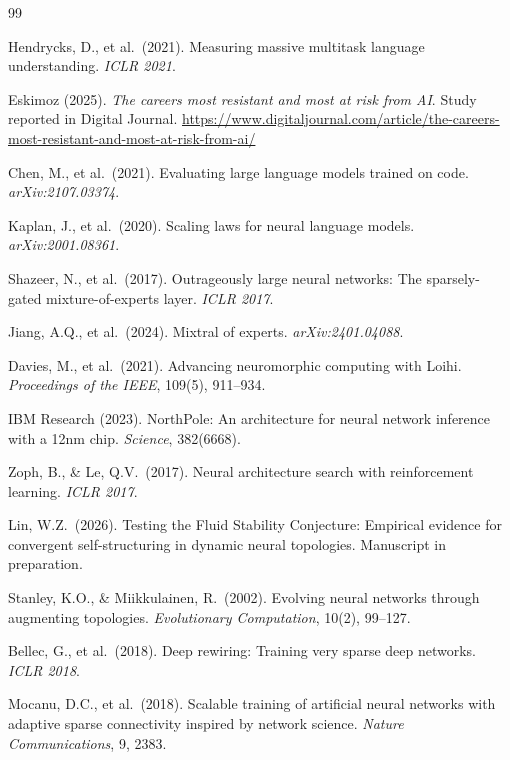 \documentclass[12pt]{article}
\begin{document}
\begin{thebibliography}{99}

 Hendrycks, D., et al.\ (2021). Measuring massive multitask language understanding. \textit{ICLR 2021}.

 Eskimoz (2025). \textit{The careers most resistant and most at risk from AI}. Study reported in Digital Journal. \url{https://www.digitaljournal.com/article/the-careers-most-resistant-and-most-at-risk-from-ai/}

 Chen, M., et al.\ (2021). Evaluating large language models trained on code. \textit{arXiv:2107.03374}.

 Kaplan, J., et al.\ (2020). Scaling laws for neural language models. \textit{arXiv:2001.08361}.

 Shazeer, N., et al.\ (2017). Outrageously large neural networks: The sparsely-gated mixture-of-experts layer. \textit{ICLR 2017}.

 Jiang, A.Q., et al.\ (2024). Mixtral of experts. \textit{arXiv:2401.04088}.

 Davies, M., et al.\ (2021). Advancing neuromorphic computing with Loihi. \textit{Proceedings of the IEEE}, 109(5), 911--934.

 IBM Research (2023). NorthPole: An architecture for neural network inference with a 12nm chip. \textit{Science}, 382(6668).

 Zoph, B., \& Le, Q.V.\ (2017). Neural architecture search with reinforcement learning. \textit{ICLR 2017}.

 Lin, W.Z.\ (2026). Testing the Fluid Stability Conjecture: Empirical evidence for convergent self-structuring in dynamic neural topologies. Manuscript in preparation.

 Stanley, K.O., \& Miikkulainen, R.\ (2002). Evolving neural networks through augmenting topologies. \textit{Evolutionary Computation}, 10(2), 99--127.

 Bellec, G., et al.\ (2018). Deep rewiring: Training very sparse deep networks. \textit{ICLR 2018}.

 Mocanu, D.C., et al.\ (2018). Scalable training of artificial neural networks with adaptive sparse connectivity inspired by network science. \textit{Nature Communications}, 9, 2383.


\end{thebibliography}
\end{document}
